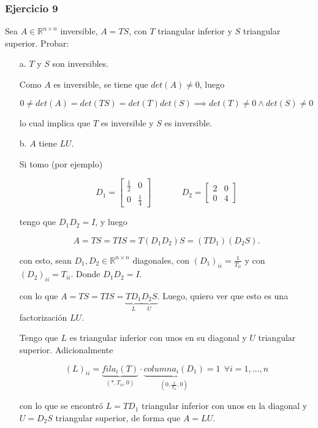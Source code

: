 \subsubsection{Ejercicio 9}\label{subsubsec:guia_2_ej_9}

Sea $A \in \mathbb{R}^{n \times n}$ inversible, $A = TS$, con $T$ triangular inferior y $S$ triangular superior. Probar:

\begin{itemize}
    \item[a.] $T$ y $S$ son inversibles.
    
    Como $A$ es inversible, se tiene que $det(A) \neq 0$, luego
    
    \[0 \neq det(A) = det(TS) = det(T)det(S) \implies det(T) \neq 0 \land det(S) \neq 0\]
    
    lo cual implica que $T$ es inversible y $S$ es inversible.
    
    \item[b.] $A$ tiene $LU$.
    
    Si tomo (por ejemplo)
    
    \[
    D_1 = 
    \begin{bmatrix}
        \frac{1}{2} & 0 \\
        0 & \frac{1}{4}
    \end{bmatrix}
    ~~~~~~~~~~~~~~~~
    D_2 = 
    \begin{bmatrix}
        2 & 0 \\
        0 & 4
    \end{bmatrix}
    \]
    
    tengo que $D_1 D_2 = I$, y luego
    
    \[A = TS = TIS = T(D_1 D_2)S = (TD_1)(D_2 S).\]
    
    con esto, sean $D_1 , D_2 \in \mathbb{R}^{n \times n}$ diagonales, con ${(D_1)}_{ii} =  \frac{1}{T_{ii}}$ y con ${(D_2)}_{ii} = T_{ii}$. Donde $D_1 D_2 = I$.
    
    con lo que $A = TS = TIS = \underbrace{TD_1}_{L}\underbrace{D_2 S}_{U}$. Luego, quiero ver que esto es una factorización $LU$.
    
    Tengo que $L$ es triangular inferior con unos en su diagonal y $U$ triangular superior. Adicionalmente
    
    \[(L)_{ii} = \underbrace{fila_i(T)}_{(*,T_{ii},0)}\cdot \underbrace{columna_i(D_1)}_{(0,\frac{1}{T_{ii}},0)} = 1 ~~\forall i = 1,\ldots,n\]
    
    con lo que se encontró $L = TD_1$ triangular inferior con unos en la diagonal y $U = D_2 S$ triangular superior, de forma que $A = LU$.
    

\end{itemize}
